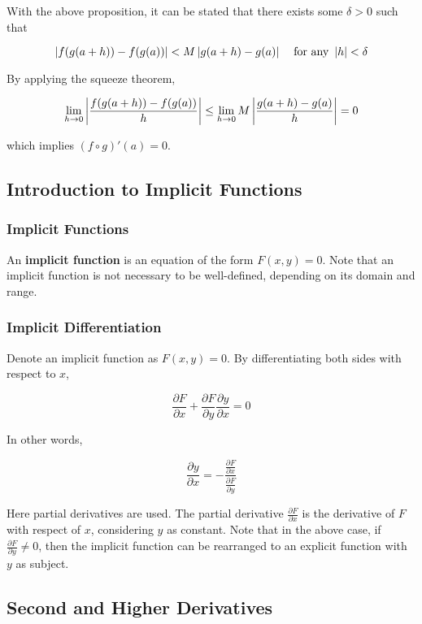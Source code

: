 \documentclass[a4paper,12pt]{article}
\begin{document}
With the above proposition, it can be stated that there exists some $\delta>0$ such that

$$\left| f(g(a+h))-f(g(a))\right|<M\left| g(a+h)-g(a)\right|\;\;\;\;\text{for any }\left| h\right|<\delta$$\s

By applying the squeeze theorem,

$$\lim_{h\to 0}\left| \frac{f(g(a+h))-f(g(a))}{h}\right|\leq\lim_{h\to 0}M\left| \frac{g(a+h)-g(a)}{h}\right|=0$$\s

which implies $(f\circ g)'(a)=0$.

\subsection{Introduction to Implicit Functions}
\subsubsection{Implicit Functions}
\begin{dft}
  An \textbf{implicit function} is an equation of the form $F(x,y)=0$. Note that an implicit function is not necessary to be well-defined, depending on its domain and range.
\end{dft}

\subsubsection{Implicit Differentiation}
\begin{dft}
  Denote an implicit function as $F(x,y)=0$. By differentiating both sides with respect to $x$,

  $$\frac{\partial F}{\partial x}+\frac{\partial F}{\partial y}\frac{\partial y}{\partial x}=0$$
\end{dft}\n

In other words,

$$\frac{\partial y}{\partial x}=-\frac{\frac{\partial F}{\partial x}}{\frac{\partial F}{\partial y}}$$\s

Here partial derivatives are used. The partial derivative $\frac{\partial F}{\partial x}$ is the derivative of $F$ with respect of $x$, considering $y$ as constant. Note that in the above case, if $\frac{\partial F}{\partial y}\neq 0$, then the implicit function can be rearranged to an explicit function with $y$ as subject.

\subsection{Second and Higher Derivatives}
\end{document}
